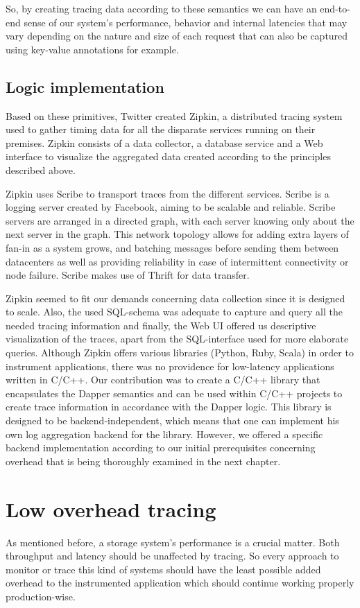\documentclass[a4paper,10pt,twocolumn]{article}
\begin{document}
So, by creating tracing data according to these semantics we can have an
end-to-end sense of our system's performance, behavior and internal latencies
that may vary depending on the nature and size of each request that can also be
captured using key-value annotations for example.

\subsection{Logic implementation} Based on these primitives, Twitter created
Zipkin\cite{zipkin}, a distributed tracing system used to gather timing data for
all the disparate services running on their premises. Zipkin consists of a data
collector, a database service and a Web interface to visualize the aggregated
data created according to the principles described above.

Zipkin uses Scribe\cite{scribe} to transport traces from the different services.
Scribe is a logging server created by Facebook, aiming to be scalable and
reliable. Scribe servers are arranged in a directed graph, with each server
knowing only about the next server in the graph. This network topology allows
for adding extra layers of fan-in as a system grows, and batching messages
before sending them between datacenters as well as providing reliability in case
of intermittent connectivity or node failure. Scribe makes use of
Thrift\cite{thift} for data transfer.

Zipkin seemed to fit our demands concerning data collection since it is designed
to scale. Also, the used SQL-schema was adequate to capture and query all the
needed tracing information and finally, the Web UI offered us descriptive
visualization of the traces, apart from the SQL-interface used for more
elaborate queries. Although Zipkin offers various libraries (Python, Ruby,
Scala) in order to instrument applications, there was no providence for
low-latency applications written in C/C++. Our contribution was to create a
C/C++ library that encapsulates the Dapper semantics and can be used within
C/C++ projects to create trace information in accordance with the Dapper logic.
This library is designed to be backend-independent, which means that one can
implement his own log aggregation backend for the library. However, we offered a
specific backend implementation according to our initial prerequisites
concerning overhead that is being thoroughly examined in the next chapter.

\section{Low overhead tracing} As mentioned before, a storage system's
performance is a crucial matter. Both throughput and latency should be
unaffected by tracing. So every approach to monitor or trace this kind of
systems should have the least possible added overhead to the instrumented
application which should continue working properly production-wise.
\end{document}
